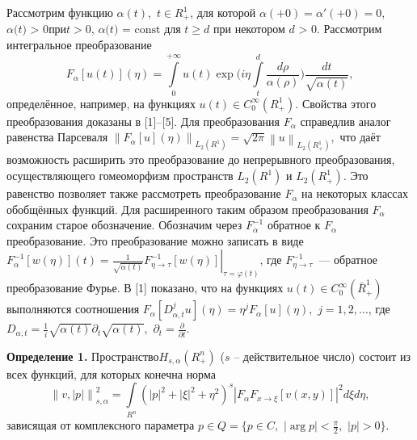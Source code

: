 


\vzmscaption


Рассмотрим функцию $\alpha (t),\,\,t \in R_ + ^1 $, для которой $\alpha ( +
0) = {\alpha }'( + 0) = 0$, $\alpha \mbox{(}t\mbox{) > 0}$при$t > 0$,
$\alpha \mbox{(}t\mbox{) = const}$ для $t \geqslant d$ при некотором $d\mbox{ >
0}$. Рассмотрим интегральное преобразование
\[
F_\alpha [u(t)](\eta ) = \int\limits_0^{ + \infty } {u(t)\exp (i\eta }
\int\limits_t^d {\frac{d\rho }{\alpha (\rho )}} )\frac{dt}{\sqrt {\alpha
(t)} },
\]
определённое, например,
на функциях $u(t) \in C_0^\infty (R_ + ^1
)$.
Свойства этого преобразования доказаны в
[1]--[5].
Для преобразования $F_\alpha $ справедлив аналог равенства Парсеваля
$\left\| {F_\alpha [u](\eta )} \right\|_{L_2 (R^1)} = \sqrt {2\pi } \left\|
u \right\|_{L_2 (R_ + ^1 )} ,$ что даёт возможность расширить это
преобразование до непрерывного преобразования, осуществляющего гомеоморфизм
пространств $L_{2} (R^1)$ и $L_{2} (R_ + ^1 )$. Это равенство
позволяет также рассмотреть преобразование $F_\alpha $ на некоторых классах
обобщённых функций. Для расширенного таким образом
\linebreak
преобразования $F_\alpha
$ сохраним старое обозначение. Обозначим через $F_\alpha ^{ - 1} $ обратное
к $F_\alpha $ преобразование. Это преобразование можно записать в виде
$F_\alpha ^{ - 1} [w(\eta )](t) = \left. {\frac{1}{\sqrt {\alpha (t)}
}F_{\eta \to \tau }^{ - 1} [w(\eta )]} \right|_{\tau = \varphi (t)} $, где
$F_{\eta \to \tau }^{ - 1} $~--- обратное преобразование Фурье. В [1]
показано, что на функциях $u(t) \in C_0^\infty (\bar {R}_ + ^1 )$
выполняются соотношения
\linebreak
$F_\alpha [D_{\alpha ,t}^j u](\eta ) = \eta
^jF_\alpha [u](\eta ),\,\,j = 1,2,...$, где $D_{\alpha ,t} =
\frac{1}{i}\sqrt {\alpha (t)} \partial _t \sqrt {\alpha (t)}
,$ $\partial _t = \frac{\partial }{\partial t}.$

\textbf{Определение 1.} Пространство$H_{s,\alpha } (R_ + ^n )$ ($s$ --
действительное число) состоит из всех функций, для которых конечна норма
\[
\left\| {v,\left| p \right|} \right\|_{s,\alpha }^2 = \int\limits_{R^n}
{(\left| p \right|^2 + \left| \xi \right|^2 + \eta ^2)^s\left| {F_\alpha
F_{x \to \xi } [v(x,y)]} \right|^2d\xi d\eta } ,
\]
зависящая от комплексного параметра $p \in Q = \{p \in C,\,\,\left| {\arg p}
\right| < \frac{\pi }{2},\,\,\left| p \right| > 0\}$.

